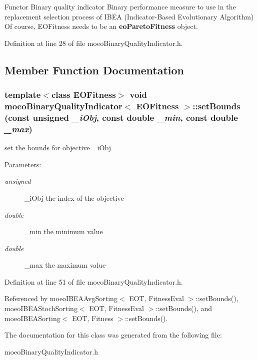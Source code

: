 Functor Binary quality indicator Binary performance measure to use in the replacement selection process of IBEA (Indicator-Based Evolutionary Algorithm) Of course, EOFitness needs to be an {\bf eo\-Pareto\-Fitness} object. 



Definition at line 28 of file moeo\-Binary\-Quality\-Indicator.h.

\subsection{Member Function Documentation}
\subsubsection{\setlength{\rightskip}{0pt plus 5cm}template$<$class EOFitness$>$ void {\bf moeo\-Binary\-Quality\-Indicator}$<$ EOFitness $>$::set\-Bounds (const unsigned {\em \_\-i\-Obj}, const double {\em \_\-min}, const double {\em \_\-max})\hspace{0.3cm}{\tt  [inline]}}\label{classmoeoBinaryQualityIndicator_a08220a55c86a4e0dd1c8977eb625c9f}


set the bounds for objective \_\-i\-Obj 

\begin{Desc}
\item[Parameters:]
\begin{description}
\item[{\em unsigned}]\_\-i\-Obj the index of the objective \item[{\em double}]\_\-min the minimum value \item[{\em double}]\_\-max the maximum value \end{description}
\end{Desc}


Definition at line 51 of file moeo\-Binary\-Quality\-Indicator.h.

Referenced by moeo\-IBEAAvg\-Sorting$<$ EOT, Fitness\-Eval $>$::set\-Bounds(), moeo\-IBEAStoch\-Sorting$<$ EOT, Fitness\-Eval $>$::set\-Bounds(), and moeo\-IBEASorting$<$ EOT, Fitness $>$::set\-Bounds().

The documentation for this class was generated from the following file:\begin{CompactItemize}
\item 
moeo\-Binary\-Quality\-Indicator.h\end{CompactItemize}
